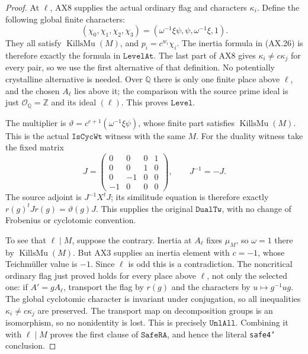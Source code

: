 \begin{proof}
At $\ell$, AX8 supplies the actual ordinary flag and characters
$\kappa_i$.  Define the following global finite characters:
\[
 (\chi_0,\chi_1,\chi_2,\chi_3)
       =(\omega^{-1}\xi\psi,\psi,\omega^{-1}\xi,1).
 \tag{AX.31}
\]
They all satisfy $\operatorname{KillsMu}(M)$, and
$p_i=c^{w_i}\chi_i$.  The inertia formula in (AX.26) is
therefore exactly the formula in $\mathtt{LevelAt}$.
The last part of AX8 gives
$\kappa_i\ne c\kappa_j$ for every pair, so we use the first
alternative of that definition.  No potentially crystalline
alternative is needed.  Over $\mathbb Q$ there is only one
finite place above $\ell$, and the chosen $A_\ell$ lies above
it; the comparison with the source prime ideal is just
$\mathcal O_{\mathbb Q}=\mathbb Z$ and its ideal $(\ell)$.
This proves $\mathtt{Level}$.

The multiplier is
$\vartheta=c^{e+1}(\omega^{-1}\xi\psi)$, whose finite part
satisfies $\operatorname{KillsMu}(M)$.  This is the actual
$\mathtt{IsCycWt}$ witness with the same $M$.
For the duality witness take the fixed matrix
\[
 J=\begin{pmatrix}0&0&0&1\\0&0&1&0\\0&-1&0&0\\-1&0&0&0\end{pmatrix},
 \qquad J^{-1}=-J.
 \tag{AX.32}
\]
The source adjoint is $J^{-1}X^tJ$; its similitude equation is
therefore exactly $r(g)^tJr(g)=\vartheta(g)J$.
This supplies the original $\mathtt{DualTw}$, with no change of
Frobenius or cyclotomic convention.

To see that $\ell\mid M$, suppose the contrary.  Inertia at
$A_\ell$ fixes $\mu_M$, so $\omega=1$ there by
$\operatorname{KillsMu}(M)$.  But AX3 supplies an inertia element
with $c=-1$, whose Teichm\"uller value is $-1$.  Since $\ell$
is odd this is a contradiction.  The noncritical ordinary flag
just proved holds for every place above $\ell$, not only the
selected one: if $A'=gA_\ell$, transport the flag by $r(g)$
and the characters by $u\mapsto g^{-1}ug$.
The global cyclotomic character is invariant under conjugation,
so all inequalities $\kappa_i\ne c\kappa_j$ are preserved.
The transport map on decomposition groups is an isomorphism,
so no nonidentity is lost.  This is precisely
$\mathtt{UnlAll}$.  Combining it with $\ell\mid M$ proves
the first clause of $\mathtt{SafeRA}$, and hence the literal
\texttt{safe4'} conclusion.
\end{proof}

